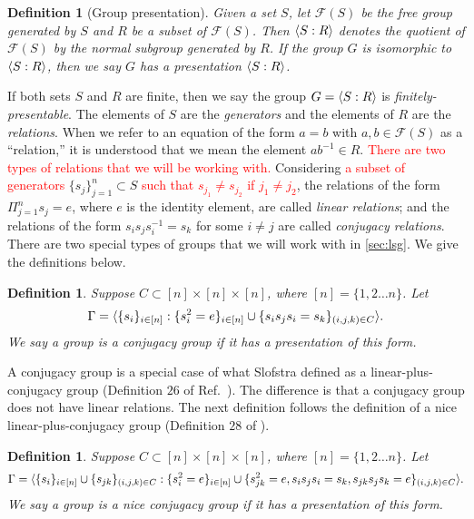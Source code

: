 \documentclass[11pt,letterpaper]{article}
\DeclarePairedDelimiter{\ip}{\langle}{\rangle}
\newcommand{\1}{\mathbb{1}}
\newcommand{\hf}[1]{\textcolor{red}{#1}}
\newtheorem{definition}[theorem]{Definition}
\theoremstyle{definition}
\begin{document}
\begin{definition}[Group presentation]
    Given a set $S$, let $\mathcal{F}(S)$ be the free group generated by $S$ and $R$ be a subset of $\mathcal{F}(S)$.
    Then $\ip{S:R}$ denotes the quotient of $\mathcal{F}(S)$
    by the normal subgroup generated by $R$.
    If the group $G$ is isomorphic to $\ip{S:R}$,
    then we say $G$ 
    has a presentation $\ip{S:R}$. 
\end{definition}
If both sets $S$ and $R$ are finite, then we say the group $G = \ip{S:R}$ is \emph{finitely-presentable}.
The elements of $S$ are the \emph{generators} and the elements
of $R$ are the \emph{relations}.
When we refer to an equation
of the form $a = b$ with $a, b \in \mathcal{F} ( S )$ as a ``relation,'' 
it is understood 
that we mean the element $ab^{-1} 
\in R$.
\hf{ There are two types of relations that we will be working with.
} 
Considering \hf{a subset of generators} $\{ s_j \}_{j=1}^n \subset S$ \hf{such that $s_{j_1} \neq s_{j_2}$ if $j_1 \neq j_2$},
the relations of the form $\Pi_{j=1}^n s_j  = e$, where $e$ is the identity element, are called 
\emph{linear relations};
and the relations of the form
$s_i s_j s_i^{-1} = s_k$ for some $i \neq j$ are called \emph{conjugacy relations}.   
There are two special types of groups that we will work with in \cref{sec:lsg}. We give the definitions below.
\begin{definition}
    \label{def:spe_conj_grp}
    Suppose $C \subset [n] \times [n] \times [n]$, where $[n] = \{1,2 \dots n\}$. 
    Let
    \begin{align*}
        \Gamma = \ip{\{s_i\}_{i \in [n]}  :
        \{s_i^2=e\}_{i\in [n]} \cup 
        \{ s_i s_j s_i = s_k\}_{(i,j,k)\in C}}.
    \end{align*}
    We say a group is a conjugacy group if it has a presentation of this form. 
\end{definition}
A conjugacy group is a special case of what Slofstra defined as 
a linear-plus-conjugacy group (Definition $26$ of Ref.~\cite{slofstra2017}). The difference is that a conjugacy group does not have linear relations. The next definition follows the 
definition of a nice linear-plus-conjugacy group (Definition $28$ of \cite{slofstra2017}).
\begin{definition}
    \label{def:nice_conj_grp}
    Suppose $C \subset [n] \times [n] \times [n]$, where $[n] = \{1,2 \dots n\}$. 
    Let 
    \begin{align*}
        \Gamma = \ip{\{s_i\}_{i \in [n]} \cup \{s_{jk}\}_{(i,j,k)\in C} :
        \{s_i^2=e\}_{i\in [n]} \cup 
        \{s_{jk}^2 = e, s_is_js_i = s_k, s_{jk}s_js_k = e\}_{(i,j,k)\in C}}.
    \end{align*}
    We say a group is a nice conjugacy group if it has a presentation of this form. 
\end{definition}
\end{document}
